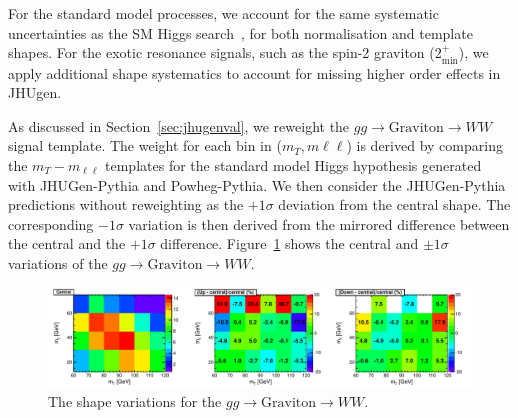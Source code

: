 For the standard model processes, we account for the same systematic
uncertainties as the SM Higgs search~\cite{HWW2012Final},
for both normalisation and template shapes.
For the exotic resonance signals, such as the spin-2 
graviton ($2_\text{min}^+$), we apply additional 
shape systematics to account for missing higher order effects in JHUgen. 

As discussed in Section~\ref{sec:jhugenval}, we reweight the $gg\to \text{Graviton}\to WW$
signal template.
The weight for each bin in ($m_T, m{\ell\ell}$) is derived by comparing
the $m_T-m_{\ell\ell}$ templates for the standard model Higgs hypothesis
generated with JHUGen-Pythia and Powheg-Pythia.
We then consider the JHUGen-Pythia 
predictions without reweighting as the $+1\sigma$ deviation from the central shape.
The corresponding $-1\sigma$ variation is then derived from the mirrored difference between 
the central and the $+1\sigma$ difference. 
Figure~\ref{fig:xwwshapevar} shows the central and $\pm1\sigma$ variations 
of the $gg\to \text{Graviton}\to WW$. 

\vspace{20pt}


\begin{figure}[!hbtp]
\centering
\label{subfig:xwwshapevar}
\includegraphics[width=1.05\textwidth]{figures/xww_ggHshapevar.pdf}
\caption{The shape variations for the $gg\to \text{Graviton}\to WW$. 
}
\label{fig:xwwshapevar}
\end{figure}
